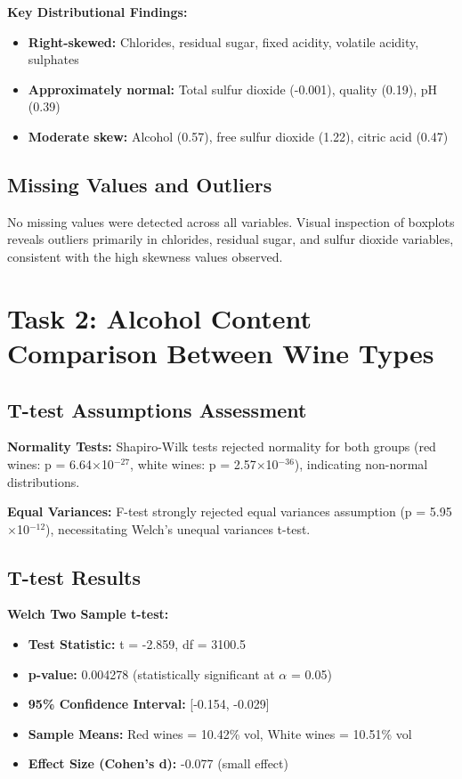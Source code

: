 \textbf{Key Distributional Findings:}
\begin{itemize}
\item \textbf{Right-skewed:} Chlorides, residual sugar, fixed acidity, volatile acidity, sulphates
\item \textbf{Approximately normal:} Total sulfur dioxide (-0.001), quality (0.19), pH (0.39)
\item \textbf{Moderate skew:} Alcohol (0.57), free sulfur dioxide (1.22), citric acid (0.47)
\end{itemize}

\subsection{Missing Values and Outliers}
No missing values were detected across all variables. Visual inspection of boxplots reveals outliers primarily in chlorides, residual sugar, and sulfur dioxide variables, consistent with the high skewness values observed.

\section{Task 2: Alcohol Content Comparison Between Wine Types}

\subsection{T-test Assumptions Assessment}
\textbf{Normality Tests:} Shapiro-Wilk tests rejected normality for both groups (red wines: p = 6.64$\times$10$^{-27}$, white wines: p = 2.57$\times$10$^{-36}$), indicating non-normal distributions.

\textbf{Equal Variances:} F-test strongly rejected equal variances assumption (p = 5.95$\times$10$^{-12}$), necessitating Welch's unequal variances t-test.

\subsection{T-test Results}
\textbf{Welch Two Sample t-test:}
\begin{itemize}
\item \textbf{Test Statistic:} t = -2.859, df = 3100.5
\item \textbf{p-value:} 0.004278 (statistically significant at $\alpha$ = 0.05)
\item \textbf{95\% Confidence Interval:} [-0.154, -0.029]
\item \textbf{Sample Means:} Red wines = 10.42\% vol, White wines = 10.51\% vol
\item \textbf{Effect Size (Cohen's d):} -0.077 (small effect)
\end{itemize}

